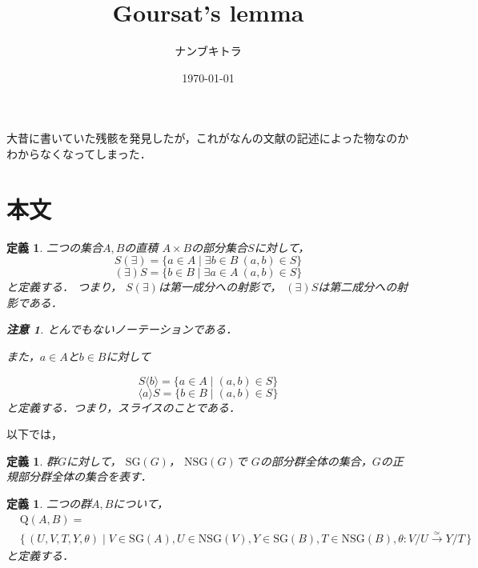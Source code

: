 \documentclass[leqno]{jsarticle}
\title{Goursat's lemma}
\author{ナンブキトラ}
\date{\today}
\newtheorem{df}[thm]{定義}
\newtheorem*{rmk}{注意}
\newcommand{\myproja}[1]{(\exists)#1}
\newcommand{\myprojb}[1]{#1(\exists)}
\newcommand{\mysliceb}[2]{#1\langle #2\rangle}
\newcommand{\myslicea}[2]{\langle #2\rangle#1}
\newcommand{\myqq}[2]{\mathrm{Q}(#1, #2)}
\newcommand{\mynsg}[1]{\mathrm{NSG}(#1)}
\newcommand{\mysg}[1]{\mathrm{SG}(#1)}
\begin{document}
\maketitle


大昔に書いていた残骸を発見したが，これがなんの文献の記述によった物なのかわからなくなってしまった．

\section{本文}
\begin{df}
二つの集合$A, B$の直積
$A\times B$の部分集合$S$に対して，
\[
\myprojb{S}=\{a\in A\mid \exists b\in B\ (a, b)\in S\}
\]
\[
\myproja{S}=\{b\in B\mid \exists a\in A\ (a, b)\in S\}
\]
と定義する．
つまり，
$\myprojb{S}$は第一成分への射影で，
$\myproja{S}$は第二成分への射影である．
\begin{rmk}
とんでもないノーテーションである．
\end{rmk}
また，$a\in A$と$b\in B$に対して

\[
\mysliceb{S}{b}=\{a\in A\mid (a,b)\in S\}
\]
\[
\myslicea{S}{a}=\{b\in B\mid (a, b)\in S\}
\]
と定義する．つまり，スライスのことである．
\end{df}

以下では，
\begin{df}
群$G$に対して，
$\mysg{G}$，
$\mynsg{G}$で
$G$の部分群全体の集合，$G$の正規部分群全体の集合を表す．
\end{df}
\begin{df}
二つの群$A, B$について，
\begin{align*}
&\myqq{A}{B}=\\
&
\{\, (U, V, T, Y, \theta)\mid V\in \mysg{A}, U\in \mynsg{V}, Y\in \mysg{B}, T\in \mynsg{B}, \theta:V/U\overset{\simeq}{\to} Y/T\, \}
\end{align*}
と定義する．
\end{df}
\end{document}
